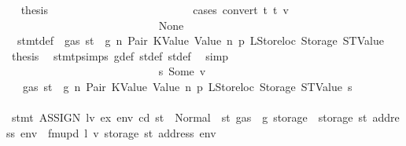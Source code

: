 \begin{isabellebody}
\ \isamarkupfalse%
\ {\isacharquery}{\kern0pt}thesis\isanewline
\ \ \ \ \ \ \ \ \ \ \ \ \ \ \ \ \ \ \ \ \ \ \ \ \isamarkupfalse%
\ {\isacharparenleft}{\kern0pt}cases\ {\isachardoublequoteopen}convert\ t\ t{\isacharprime}{\kern0pt}\ v\ {\isachardoublequoteclose}{\isacharparenright}{\kern0pt}\isanewline
\ \ \ \ \ \ \ \ \ \ \ \ \ \ \ \ \ \ \ \ \ \ \ \ \ \ \isamarkupfalse%
\ None\isanewline
\ \ \ \ \ \ \ \ \ \ \ \ \ \ \ \ \ \ \ \ \ \ \ \ \ \ \isamarkupfalse%
\ {}{\isacharparenleft}{\kern0pt}{}{\isacharparenright}{\kern0pt}\ stmt{\isacharunderscore}{\kern0pt}def\ {\isacharbackquoteopen}{\isasymnot}\ gas\ st\ {\isasymle}\ g{\isacharbackquoteclose}\ n\ Pair\ KValue\ Value\ n{}\ p{}\ LStoreloc\ Storage\ STValue\ \isamarkupfalse%
\ {\isacharquery}{\kern0pt}thesis\ \isamarkupfalse%
\ stmt{\isachardot}{\kern0pt}psimps{\isacharparenleft}{\kern0pt}{}{\isacharparenright}{\kern0pt}\ g{\isacharunderscore}{\kern0pt}def\ st{\isacharprime}{\kern0pt}{\isacharunderscore}{\kern0pt}def\ st{\isacharprime}{\kern0pt}{\isacharprime}{\kern0pt}{\isacharunderscore}{\kern0pt}def\ \isamarkupfalse%
\ simp\isanewline
\ \ \ \ \ \ \ \ \ \ \ \ \ \ \ \ \ \ \ \ \ \ \ \ \isamarkupfalse%
\isanewline
\ \ \ \ \ \ \ \ \ \ \ \ \ \ \ \ \ \ \ \ \ \ \ \ \ \ \isamarkupfalse%
\ s{}{\isacharcolon}{\kern0pt}\ {\isacharparenleft}{\kern0pt}Some\ v{\isacharprime}{\kern0pt}{\isacharparenright}{\kern0pt}\isanewline
\ \ \ \ \ \ \ \ \ \ \ \ \ \ \ \ \ \ \ \ \ \ \ \ \ \ \isamarkupfalse%
\ {}{\isacharparenleft}{\kern0pt}{}{\isacharparenright}{\kern0pt}\ {\isacharbackquoteopen}{\isasymnot}\ gas\ st\ {\isasymle}\ g{\isacharbackquoteclose}\ n\ Pair\ KValue\ Value\ n{}\ p{}\ LStoreloc\ Storage\ STValue\ s{}\isanewline
\ \ \ \ \ \ \ \ \ \ \ \ \ \ \ \ \ \ \ \ \ \ \ \ \ \ \isamarkupfalse%
\ {\isachardoublequoteopen}stmt\ {\isacharparenleft}{\kern0pt}ASSIGN\ lv\ ex{\isacharparenright}{\kern0pt}\ env\ cd\ st\ {\isacharequal}{\kern0pt}\ Normal\ {\isacharparenleft}{\kern0pt}{\isacharparenleft}{\kern0pt}{\isacharparenright}{\kern0pt}{\isacharcomma}{\kern0pt}\ st{\isacharprime}{\kern0pt}{\isacharprime}{\kern0pt}\ {\isasymlparr}gas\ {\isacharcolon}{\kern0pt}{\isacharequal}{\kern0pt}\ g{\isacharprime}{\kern0pt}{\isacharprime}{\kern0pt}{\isacharcomma}{\kern0pt}\ storage\ {\isacharcolon}{\kern0pt}{\isacharequal}{\kern0pt}\ {\isacharparenleft}{\kern0pt}storage\ st{\isacharprime}{\kern0pt}{\isacharprime}{\kern0pt}{\isacharparenright}{\kern0pt}\ {\isacharparenleft}{\kern0pt}address\ env\ {\isacharcolon}{\kern0pt}{\isacharequal}{\kern0pt}\ fmupd\ l\ v{\isacharprime}{\kern0pt}\ {\isacharparenleft}{\kern0pt}storage\ st{\isacharprime}{\kern0pt}{\isacharprime}{\kern0pt}\ {\isacharparenleft}{\kern0pt}address\ env{\isacharparenright}{\kern0pt}{\isacharparenright}{\kern0pt}{\isacharparenright}{\kern0pt}{\isasymrparr}{\isacharparenright}{\kern0pt}{\isachardoublequoteclose}\isanewline

\end{isabellebody}
